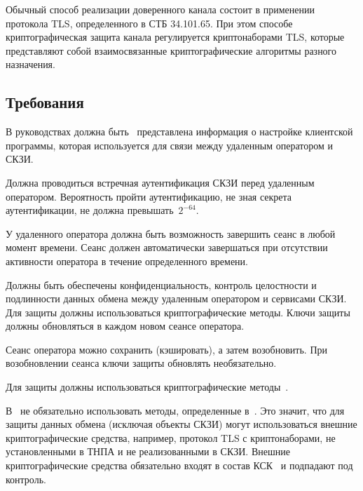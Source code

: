Обычный способ реализации доверенного канала состоит в применении протокола 
TLS, определенного в СТБ 34.101.65. При этом способе криптографическая
защита канала регулируется криптонаборами TLS, которые представляют
собой взаимосвязанные криптографические алгоритмы разного назначения.

\subsection{Требования}\label{TC.Reqs}

\label{R.TC.GD}
В руководствах должна быть~
представлена информация о настройке клиентской программы, которая используется 
для связи между удаленным оператором и СКЗИ.

\label{R.TC.Auth}

\label{R.TC.Auth2}
Должна проводиться встречная аутентификация СКЗИ перед удаленным оператором.
Вероятность пройти аутентификацию, не зная секрета аутентификации, 
не должна превышать~$2^{-64}$.

\label{R.TC.Logout}
У удаленного оператора должна быть возможность завершить сеанс в любой момент 
времени. Сеанс должен автоматически завершаться при отсутствии активности 
оператора в течение определенного времени.

\label{R.TC.Crypto}
Должны быть обеспечены конфиденциальность, контроль целостности и подлинности 
данных обмена между удаленным оператором и сервисами СКЗИ.
%
Для защиты должны использоваться криптографические методы.
%
Ключи защиты должны обновляться в каждом новом сеансе оператора.

\begin{note}
Сеанс оператора можно сохранить (кэшировать), а затем возобновить.
При возобновлении сеанса ключи защиты обновлять необязательно.
\end{note}

\label{R.TC.CryptoBY}
Для защиты должны использоваться криптографические 
методы~. 

\begin{note}
В~ не обязательно использовать методы,
определенные в~. Это значит, что для защиты 
данных обмена (исключая объекты СКЗИ) могут использоваться внешние 
криптографические средства, например, протокол TLS с криптонаборами, 
не установленными в ТНПА и не реализованными в СКЗИ. 
%
Внешние криптографические средства обязательно входят в состав 
КСК~ и подпадают под контроль.
\end{note}


